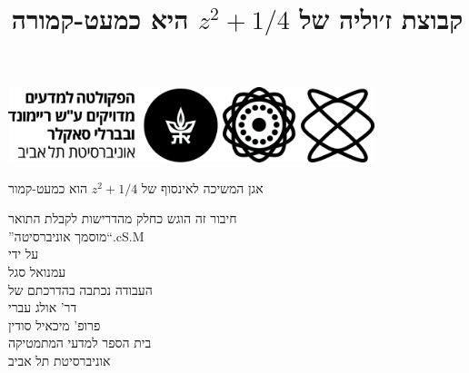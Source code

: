 \documentclass[11pt,titlepage]{article}
\title{קבוצת ז׳וליה של $z^2+1/4$ היא כמעט-קמורה}
\begin{document}


\begin{titlepage}
    \begin{center}
        \vspace*{0.05cm}
        \includegraphics[width=0.8\textwidth]{figures/Logo_Exact_Sciences_Hebrew_Black.jpeg}\\
        \vspace{3cm}
        {\huge אגן המשיכה לאינסוף של $z^2+1/4$ הוא כמעט-קמור \par}
        \vspace{1cm}
        {\large חיבור זה הוגש כחלק מהדרישות לקבלת התואר\\
        \textquotedblright מוסמך אוניברסיטה\textquotedblleft\text{ }\textendash \text{ }.cS.M}\\
        \vspace{2cm}
        { על ידי}\\
        \vspace{0.3cm}
        {\large {עמנואל סגל}}\\
        \vspace{1.5cm}
        {\large העבודה נכתבה בהדרכתם של}\\
        \vspace{0.3cm}
        {\huge דר' אולג עברי} \\
        {\huge פרופ' מיכאיל סודין\\
        \vspace{1cm}
        {\Large בית הספר למדעי המתמטיקה \\ אוניברסיטת תל אביב}}
    \end{center}
\end{titlepage}
\end{document}
